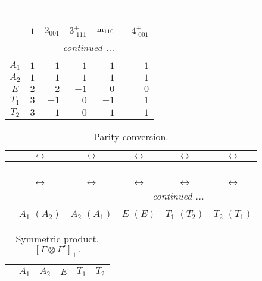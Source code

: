 \documentclass[fleqn,10pt,landscape]{article}
\begin{document}
\begin{itemize}
\begin{center}
\begin{longtable}{c|rrrrr}
\multicolumn{5}{l}{\tablename\ \thetable{}} \\
 \hline \hline
 & $ 1 $ & $ 2{}_{001} $ & $ 3^{+}_{\,\,111} $ & $ {\rm m}_{110} $ & $ -4^{+}_{\,\,001} $ \\ \hline \endhead

 \hline \hline
\multicolumn{5}{r}{\footnotesize\it continued ...} \\ \endfoot

 \hline \hline
\multicolumn{5}{r}{} \\ \endlastfoot

$ A_{1} $ & $ 1 $ & $ 1 $ & $ 1 $ & $ 1 $ & $ 1 $ \\
$ A_{2} $ & $ 1 $ & $ 1 $ & $ 1 $ & $ -1 $ & $ -1 $ \\
$ E $ & $ 2 $ & $ 2 $ & $ -1 $ & $ 0 $ & $ 0 $ \\
$ T_{1} $ & $ 3 $ & $ -1 $ & $ 0 $ & $ -1 $ & $ 1 $ \\
$ T_{2} $ & $ 3 $ & $ -1 $ & $ 0 $ & $ 1 $ & $ -1 $ \\
\end{longtable}
\end{center}
\begin{center}
\renewcommand{\arraystretch}{1.0}
\begin{longtable}{cccccc}
\caption{Parity conversion.}
 \\
 \hline \hline
 & $\leftrightarrow$ & $\leftrightarrow$ & $\leftrightarrow$ & $\leftrightarrow$ & $\leftrightarrow$ \\ \hline \endfirsthead

\multicolumn{5}{l}{\tablename\ \thetable{}} \\
 \hline \hline
 & $\leftrightarrow$ & $\leftrightarrow$ & $\leftrightarrow$ & $\leftrightarrow$ & $\leftrightarrow$ \\ \hline \endhead

 \hline \hline
\multicolumn{5}{r}{\footnotesize\it continued ...} \\ \endfoot

 \hline \hline
\multicolumn{5}{r}{} \\ \endlastfoot

 & $ A_{1}\,\,(A_{2}) $ & $ A_{2}\,\,(A_{1}) $ & $ E\,\,(E) $ & $ T_{1}\,\,(T_{2}) $ & $ T_{2}\,\,(T_{1}) $ \\
\end{longtable}
\end{center}
\begin{center}
\renewcommand{\arraystretch}{1.0}
\begin{longtable}{c|ccccc}
\caption{Symmetric product, $[\Gamma\otimes\Gamma']_+.$}
 \\
 \hline \hline
 & $ A_{1} $ & $ A_{2} $ & $ E $ & $ T_{1} $ & $ T_{2} $ \\ \hline \endfirsthead


\end{longtable}
\end{center}
\end{itemize}
\end{document}
